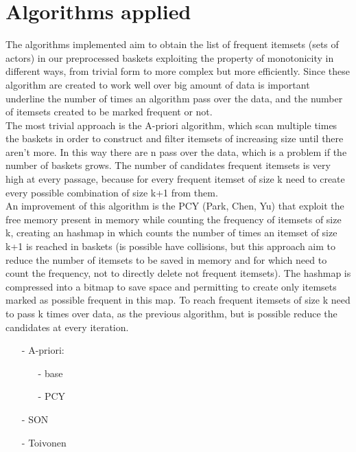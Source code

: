 \documentclass[14pt]{extarticle}
\begin{document}
\section{Algorithms applied}
The algorithms implemented aim to obtain the list of frequent itemsets (sets of actors) in our preprocessed baskets exploiting the property of monotonicity in different ways, from trivial form to more complex but more efficiently. Since these algorithm are created to work well over big amount of data is important underline the number of times an algorithm pass over the data, and the number of itemsets created to be marked frequent or not.\\
The most trivial approach is the A-priori algorithm, which scan multiple times the baskets in order to construct and filter itemsets of increasing size until there aren't more. In this way there are n pass over the data, which is a problem if the number of baskets grows. The number of candidates frequent itemsets is very high at every passage, because for every frequent itemset of size k need to create every possible combination of size k+1 from them.\\
An improvement of this algorithm is the PCY (Park, Chen, Yu) that exploit the free memory present in memory while counting the frequency of itemsets of size k, creating an hashmap in which counts the number of times an itemset of size k+1 is reached in baskets (is possible have collisions, but this approach aim to reduce the number of itemsets to be saved in memory and for which need to count the frequency, not to directly delete not frequent itemsets). The hashmap is compressed into a bitmap to save space and permitting to create only itemsets marked as possible frequent in this map. To reach frequent itemsets of size k need to pass k times over data, as the previous algorithm, but is possible reduce the candidates at every iteration.


\vspace{-0.2cm}\begin{itemize}[leftmargin=*]
\item[-] A-priori:
\vspace{-0.4cm}\begin{itemize}
\item[-] base
\vspace{-0.2cm}\item[-] PCY
\end{itemize}
\vspace{-0.4cm}\item[-] SON
\vspace{-0.4cm}\item[-] Toivonen
\end{itemize}
\end{document}
